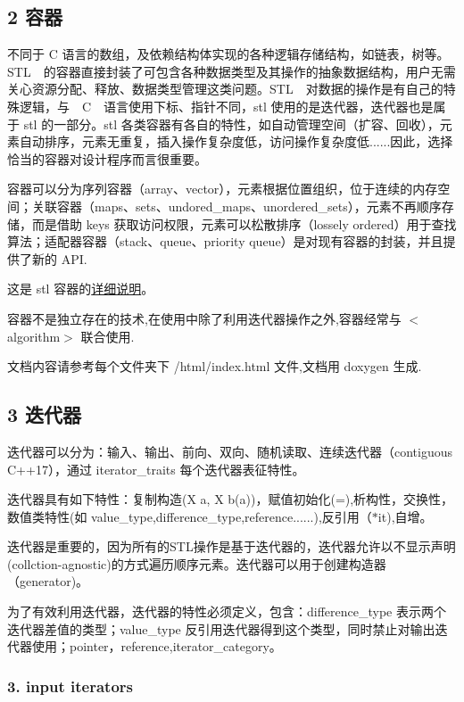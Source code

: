  \subsection*{2 容器}

不同于 C 语言的数组，及依赖结构体实现的各种逻辑存储结构，如链表，树等。\+S\+T\+L　的容器直接封装了可包含各种数据类型及其操作的抽象数据结构，用户无需关心资源分配、释放、数据类型管理这类问题。\+S\+T\+L　对数据的操作是有自己的特殊逻辑，与　\+C　语言使用下标、指针不同，stl 使用的是迭代器，迭代器也是属于 stl 的一部分。stl 各类容器有各自的特性，如自动管理空间（扩容、回收），元素自动排序，元素无重复，插入操作复杂度低，访问操作复杂度低......因此，选择恰当的容器对设计程序而言很重要。

容器可以分为序列容器（array、vector），元素根据位置组织，位于连续的内存空间；关联容器（maps、sets、undored\+\_\+maps、unordered\+\_\+sets），元素不再顺序存储，而是借助 keys 获取访问权限，元素可以松散排序（lossely ordered）用于查找算法；适配器容器（stack、queue、priority queue）是对现有容器的封装，并且提供了新的 A\+PI.

这是 stl 容器的\mbox{\hyperlink{md_ch02_container__r_e_a_d_m_e}{详细说明}}。

容器不是独立存在的技术,在使用中除了利用迭代器操作之外,容器经常与 $<$algorithm$>$ 联合使用.



文档内容请参考每个文件夹下 /html/index.html 文件,文档用 doxygen 生成.

\subsection*{3 迭代器}

迭代器可以分为：输入、输出、前向、双向、随机读取、连续迭代器（contiguous C++17），通过 iterator\+\_\+traits 每个迭代器表征特性。

迭代器具有如下特性：复制构造(\+X a, X b(a))，赋值初始化(=),析构性，交换性，数值类特性(如 value\+\_\+type,difference\+\_\+type,reference......),反引用（$\ast$it),自增。

迭代器是重要的，因为所有的\+S\+T\+L操作是基于迭代器的，迭代器允许以不显示声明(collction-\/agnostic)的方式遍历顺序元素。迭代器可以用于创建构造器（generator)。

为了有效利用迭代器，迭代器的特性必须定义，包含：difference\+\_\+type 表示两个迭代器差值的类型；value\+\_\+type 反引用迭代器得到这个类型，同时禁止对输出迭代器使用；pointer，reference,iterator\+\_\+category。

\subsubsection*{3. input iterators}

